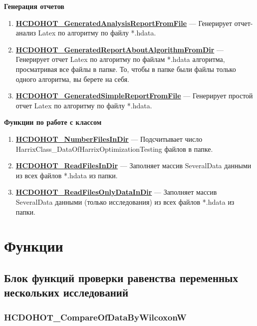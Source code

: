 \documentclass[a4paper,12pt]{article}
\begin{document}
\textbf{Генерация отчетов}
\begin{enumerate}

\item \textbf{\hyperref[HCDOHOT_GeneratedAnalysisReportFromFile]{HCDOHOT\_GeneratedAnalysisReportFromFile}} --- Генерирует отчет-анализ Latex по алгоритму по файлу *.hdata.

\item \textbf{\hyperref[HCDOHOT_GeneratedReportAboutAlgorithmFromDir]{HCDOHOT\_GeneratedReportAboutAlgorithmFromDir}} --- Генерирует отчет Latex по алгоритму по файлам *.hdata алгоритма, просматривая все файлы в папке. То, чтобы в папке были файлы только одного алгоритма, вы берете на себя.

\item \textbf{\hyperref[HCDOHOT_GeneratedSimpleReportFromFile]{HCDOHOT\_GeneratedSimpleReportFromFile}} --- Генерирует простой отчет Latex по алгоритму по файлу *.hdata.

\end{enumerate}

\textbf{Функции по работе с классом}
\begin{enumerate}

\item \textbf{\hyperref[HCDOHOT_NumberFilesInDir]{HCDOHOT\_NumberFilesInDir}} --- Подсчитывает число HarrixClass\_DataOfHarrixOptimizationTesting файлов в папке.

\item \textbf{\hyperref[HCDOHOT_ReadFilesInDir]{HCDOHOT\_ReadFilesInDir}} --- Заполняет массив SeveralData данными из всех файлов *.hdata из папки.

\item \textbf{\hyperref[HCDOHOT_ReadFilesOnlyDataInDir]{HCDOHOT\_ReadFilesOnlyDataInDir}} --- Заполняет массив SeveralData данными (только исследования) из всех файлов *.hdata из папки.

\end{enumerate}


\newpage
\section{Функции}
\subsection{Блок функций проверки равенства переменных нескольких исследований}

\subsubsection{HCDOHOT\_CompareOfDataByWilcoxonW}\label{HCDOHOT_CompareOfDataByWilcoxonW}
\end{document}
